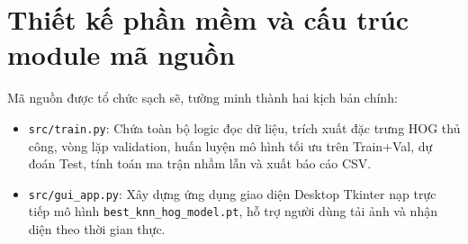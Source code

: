 \documentclass[../DoAn.tex]{subfiles}
\begin{document}
\section{Thiết kế phần mềm và cấu trúc module mã nguồn}
Mã nguồn được tổ chức sạch sẽ, tường minh thành hai kịch bản chính:
\begin{itemize}
    \item \texttt{src/train.py}: Chứa toàn bộ logic đọc dữ liệu, trích xuất đặc trưng HOG thủ công, vòng lặp validation, huấn luyện mô hình tối ưu trên Train+Val, dự đoán Test, tính toán ma trận nhầm lẫn và xuất báo cáo CSV.
    \item \texttt{src/gui\_app.py}: Xây dựng ứng dụng giao diện Desktop Tkinter nạp trực tiếp mô hình \texttt{best\_knn\_hog\_model.pt}, hỗ trợ người dùng tải ảnh và nhận diện theo thời gian thực.
\end{itemize}
\end{document}
